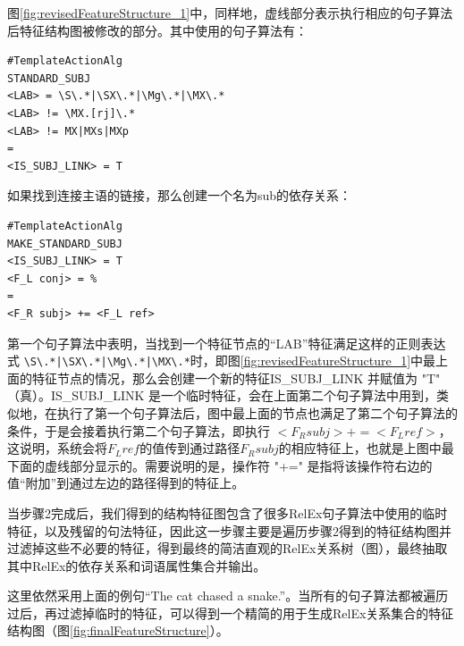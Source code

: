 图\ref{fig:revisedFeatureStructure_1}中，同样地，虚线部分表示执行相应的句子算法后特征结构图被修改的部分。其中使用的句子算法有：

\begin{verbatim}
#TemplateActionAlg
STANDARD_SUBJ
<LAB> = \S\.*|\SX\.*|\Mg\.*|\MX\.*
<LAB> != \MX.[rj]\.*
<LAB> != MX|MXs|MXp
=
<IS_SUBJ_LINK> = T
\end{verbatim}

\noindent 如果找到连接主语的链接，那么创建一个名为sub的依存关系：
\begin{verbatim}
#TemplateActionAlg
MAKE_STANDARD_SUBJ
<IS_SUBJ_LINK> = T
<F_L conj> = %
=
<F_R subj> += <F_L ref>
\end{verbatim}

第一个句子算法中表明，当找到一个特征节点的“LAB”特征满足这样的正则表达式 \verb§\S\.*|\SX\.*|\Mg\.*|\MX\.*§时，即图\ref{fig:revisedFeatureStructure_1}中最上面的特征节点的情况，那么会创建一个新的特征IS\_SUBJ\_LINK 并赋值为 "T" （真）。IS\_SUBJ\_LINK 是一个临时特征，会在上面第二个句子算法中用到，类似地，在执行了第一个句子算法后，图中最上面的节点也满足了第二个句子算法的条件，于是会接着执行第二个句子算法，即执行 $<F_R subj> += <F_L ref>$，这说明，系统会将$F_L ref$的值传到通过路径$F_R subj$的相应特征上，也就是上图中最下面的虚线部分显示的。需要说明的是，操作符 "+=" 是指将该操作符右边的值“附加”到通过左边的路径得到的特征上。


当步骤2完成后，我们得到的结构特征图包含了很多RelEx句子算法中使用的临时特征，以及残留的句法特征，因此这一步骤主要是遍历步骤2得到的特征结构图并过滤掉这些不必要的特征，得到最终的简洁直观的RelEx关系树（图），最终抽取其中RelEx的依存关系和词语属性集合并输出。

这里依然采用上面的例句“The cat chased a snake.”。当所有的句子算法都被遍历过后，再过滤掉临时的特征，可以得到一个精简的用于生成RelEx关系集合的特征结构图（图\ref{fig:finalFeatureStructure}）。

